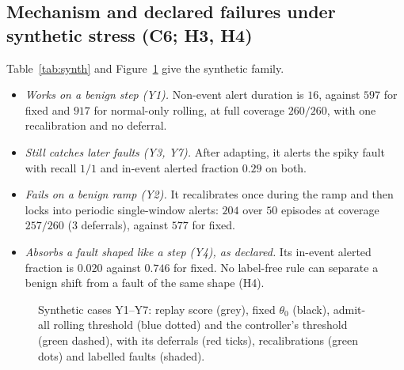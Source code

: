 \subsection{Mechanism and declared failures under synthetic stress (C6; H3, H4)}\label{sec:results-synthetic}
Table~\ref{tab:synth} and Figure~\ref{fig:synthetic-map} give the synthetic family.
\begin{itemize}[leftmargin=1.4em, itemsep=1pt, topsep=1pt]
  \item \emph{Works on a benign step (Y1).} Non-event alert duration is $16$, against
    $597$ for fixed and $917$ for normal-only rolling, at full coverage $260/260$, with
    one recalibration and no deferral.
  \item \emph{Still catches later faults (Y3, Y7).} After adapting, it alerts the spiky
    fault with recall $1/1$ and in-event alerted fraction $0.29$ on both.
  \item \emph{Fails on a benign ramp (Y2).} It recalibrates once during the ramp and then
    locks into periodic single-window alerts: $204$ over $50$ episodes at coverage
    $257/260$ (3 deferrals), against $577$ for fixed.
  \item \emph{Absorbs a fault shaped like a step (Y4), as declared.} Its in-event alerted
    fraction is $0.020$ against $0.746$ for fixed. No label-free rule can separate a
    benign shift from a fault of the same shape (H4).
\end{itemize}

\begin{table}[tbp]
  \centering
  \caption{Synthetic cases Y1--Y7, five arms (fixed, admit-all rolling, anchored,
  no-cap, Sun). ``Non-ev.\ dur.'' is non-event alert duration; ``In-ev.\ alert'' is the
  in-event alerted fraction; ``Def./Rec.'' is deferrals/recalibrations; ``--'' marks a
  value undefined because the case has no labelled event.}
  \label{tab:synth}
  \footnotesize
  \setlength{\tabcolsep}{4pt}
  
\end{table}

\begin{figure}[tbp]
  \centering
  \resizebox{0.78\linewidth}{!}{}
  \caption{Synthetic cases Y1--Y7: replay score (grey), fixed $\theta_0$ (black),
  admit-all rolling threshold (blue dotted) and the controller's threshold (green
  dashed), with its deferrals (red ticks), recalibrations (green dots) and labelled
  faults (shaded).}
  \label{fig:synthetic-map}
\end{figure}

